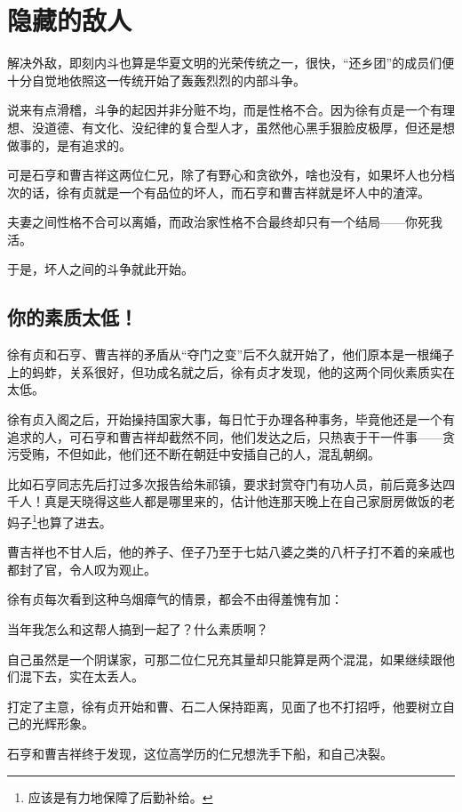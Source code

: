 \section{隐藏的敌人}
\ifnum{}
	\begin{multicols}{\theparacolNo}
		\fi
		解决外敌，即刻内斗也算是华夏文明的光荣传统之一，很快，“还乡团”的成员们便十分自觉地依照这一传统开始了轰轰烈烈的内部斗争。

		说来有点滑稽，斗争的起因并非分赃不均，而是性格不合。因为徐有贞是一个有理想、没道德、有文化、没纪律的复合型人才，虽然他心黑手狠脸皮极厚，但还是想做事的，是有追求的。

		可是石亨和曹吉祥这两位仁兄，除了有野心和贪欲外，啥也没有，如果坏人也分档次的话，徐有贞就是一个有品位的坏人，而石亨和曹吉祥就是坏人中的渣滓。

		夫妻之间性格不合可以离婚，而政治家性格不合最终却只有一个结局——你死我活。

		于是，坏人之间的斗争就此开始。

		\subsection{你的素质太低！}
		徐有贞和石亨、曹吉祥的矛盾从“夺门之变”后不久就开始了，他们原本是一根绳子上的蚂蚱，关系很好，但功成名就之后，徐有贞才发现，他的这两个同伙素质实在太低。

		徐有贞入阁之后，开始操持国家大事，每日忙于办理各种事务，毕竟他还是一个有追求的人，可石亨和曹吉祥却截然不同，他们发达之后，只热衷于干一件事——贪污受贿，不但如此，他们还不断在朝廷中安插自己的人，混乱朝纲。

		比如石亨同志先后打过多次报告给朱祁镇，要求封赏夺门有功人员，前后竟多达四千人！真是天晓得这些人都是哪里来的，估计他连那天晚上在自己家厨房做饭的老妈子\footnote{应该是有力地保障了后勤补给。}也算了进去。

		曹吉祥也不甘人后，他的养子、侄子乃至于七姑八婆之类的八杆子打不着的亲戚也都封了官，令人叹为观止。

		徐有贞每次看到这种乌烟瘴气的情景，都会不由得羞愧有加：

		当年我怎么和这帮人搞到一起了？什么素质啊？

		自己虽然是一个阴谋家，可那二位仁兄充其量却只能算是两个混混，如果继续跟他们混下去，实在太丢人。

		打定了主意，徐有贞开始和曹、石二人保持距离，见面了也不打招呼，他要树立自己的光辉形象。

		石亨和曹吉祥终于发现，这位高学历的仁兄想洗手下船，和自己决裂。


\end{multicols}
